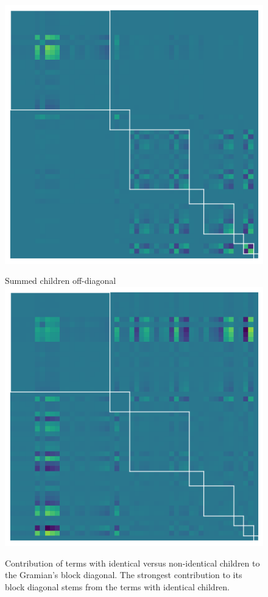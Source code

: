 \begin{figure}
\begin{minipage}[t]{0.325\linewidth}
    \includegraphics[width=\linewidth]{../kfac_pinns_exp/exp04_gramian_contributions/fig/gram_diag_children.png}
  \end{minipage}
  \hfill
  \begin{minipage}[t]{0.325\linewidth}
    \centering
    Summed children off-diagonal
    \includegraphics[width=\linewidth]{../kfac_pinns_exp/exp04_gramian_contributions/fig/gram_offdiag_children.png}
  \end{minipage}
  \caption{Contribution of terms with identical versus non-identical children to the Gramian's block diagonal.
    The strongest contribution to its block diagonal stems from the terms with identical children.}\label{fig:gramian-contribution-summed-children}
\end{figure}

